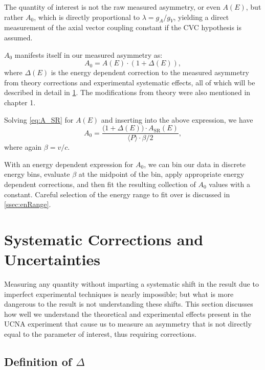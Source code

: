 The quantity of interest is not the raw measured asymmetry, or even $A(E)$,
but rather $A_0$, which is directly proportional to $\lambda=g_A/g_V$, yielding a direct 
measurement of the axial vector coupling constant if the CVC hypothesis is assumed. 

$A_0$ manifests itself in our measured asymmetry as:
%
\begin{equation}
A_0 = A(E) \cdot \left( 1 + \Delta(E) \right),
\end{equation}
%
\noindent where $\Delta(E)$ is the energy dependent correction to the measured asymmetry
from theory corrections and experimental systematic effects, all of which will be
described in detail in \ref{sec:systematics}. The modifications from theory were
also mentioned in chapter 1.

Solving \ref{eq:A_SR} for $A(E)$ and inserting into the above expression, we have 
%
\begin{equation}
  A_0 = \frac{\big( 1 + \Delta(E) \big) \cdot A_{\mathrm{SR}}(E) }
  {\langle P \rangle \cdot \beta/2},
  \label{eq:A0}
\end{equation}
%
\noindent where again $\beta=v/c$. 

With an energy dependent expression for $A_0$, we can bin our data in discrete
energy bins, evaluate $\beta$ at the midpoint of the bin, apply appropriate energy
dependent corrections, and then fit the resulting collection of $A_0$ values with a
constant. Careful selection of the energy range to fit over is discussed
in \ref{ssec:enRange}. 


\section{Systematic Corrections and Uncertainties} \label{sec:systematics}

Measuring any quantity without imparting a systematic shift in the result due to
imperfect experimental techniques is nearly impossible; but what is more dangerous
to the result is not understanding these shifts. This section discusses how well
we understand the theoretical and experimental effects present in the UCNA
experiment that cause us to measure an asymmetry that is not directly equal to
the parameter of interest, thus requiring corrections.

\subsection{Definition of $\Delta$}

